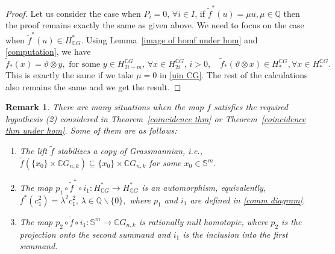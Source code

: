 \documentclass{amsart}
\newtheorem{remark}[theorem]{Remark}
\newcommand{\thmref}[1]{Theorem~\ref{#1}}
\newcommand{\lemref}[1]{Lemma~\ref{#1}}
\begin{document}
\begin{proof}
	Let us consider the case when $P_i =0,\, \forall i \in I$, if $\tilde{f}^*(u) = \mu u, \mu \in \mathbb{Q}$ then the proof remains exactly the same as given above. We need to focus on the case when $\tilde{f}^*(u)\in H^*_{\mathbb{C}G}$. Using \lemref{image of homf under hom} and \eqref{computation}, we have $$\tilde{f}_*(x) = \vartheta \otimes y, \text{ for some }y\in H_{2i-m}^{\mathbb CG}, \, \forall x \in H_{2i}^{\mathbb{C}G}, \, i>0, \quad \tilde{f}_*(\vartheta \otimes x) \in H_*^{\mathbb{C}G}, \forall x\in  H_*^{\mathbb{C}G}.$$ This is exactly the same if we take $\mu =0$ in \eqref{uin CG}. The rest of the calculations also remains the same and we get the result.
\end{proof}



\begin{remark}
	There are many situations when the map $f$ satisfies the required %
hypothesis \textit{(2)} considered %
in \thmref{coincidence thm} or \thmref{coincidence thm under hom}. Some of them are as %
follows: 
	\begin{enumerate}
		\item The lift $\tilde f$ stabilizes a copy of Grassmannian, i.e., $\tilde f(\{x_0\}\times\mathbb CG_{n,k})\subseteq \{x_0\}\times\mathbb CG_{n,k}$ for %
some $x_0\in \mathbb S^m$. 
		\item  The map $p_1\circ \tilde f^*\circ i_1: H^*_{\mathbb CG}\to H^*_{\mathbb C G}$ is an automorphism, equivalently, $f^*(c_1^2)=\lambda^2c_1^2,\, \lambda\in \mathbb Q\backslash \{0\},$ where $p_1$ and $i_1$ are defined in \eqref{comm diagram}.
		\item The map $p_2\circ \tilde f\circ i_1:\mathbb S^m\to \mathbb CG_{n,k}$ is rationally null homotopic, where $p_2$ is the projection onto the second summand and $i_1$ is the inclusion into the first summand. %
	\end{enumerate} 
\end{remark}
\end{document}
